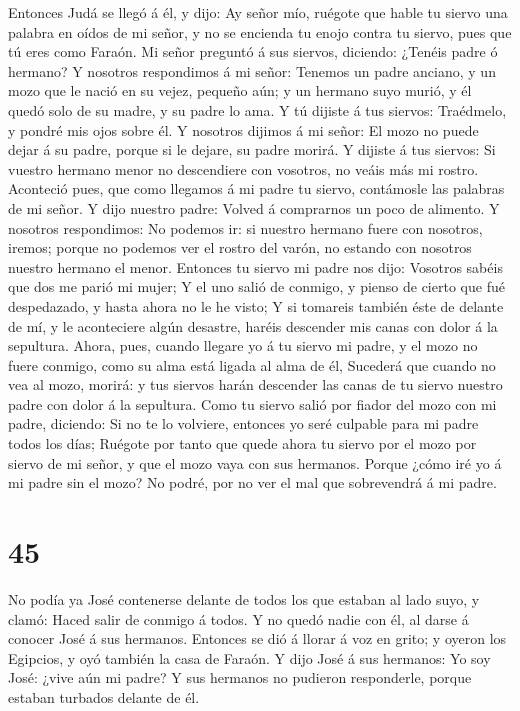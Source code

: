  Entonces Judá se llegó á él, y dijo: Ay señor mío, ruégote
que hable tu siervo una palabra en oídos de mi señor, y no se encienda
tu enojo contra tu siervo, pues que tú eres como Faraón. 
Mi señor preguntó á sus siervos, diciendo: ¿Tenéis padre ó hermano?
 Y nosotros respondimos á mi señor: Tenemos un padre
anciano, y un mozo que le nació en su vejez, pequeño aún; y un hermano
suyo murió, y él quedó solo de su madre, y su padre lo ama.
 Y tú dijiste á tus siervos: Traédmelo, y pondré mis ojos
sobre él.  Y nosotros dijimos á mi señor: El mozo no puede
dejar á su padre, porque si le dejare, su padre morirá.  Y
dijiste á tus siervos: Si vuestro hermano menor no descendiere con
vosotros, no veáis más mi rostro.  Aconteció pues, que como
llegamos á mi padre tu siervo, contámosle las palabras de mi señor.
 Y dijo nuestro padre: Volved á comprarnos un poco de
alimento.  Y nosotros respondimos: No podemos ir: si
nuestro hermano fuere con nosotros, iremos; porque no podemos ver el
rostro del varón, no estando con nosotros nuestro hermano el menor.
 Entonces tu siervo mi padre nos dijo: Vosotros sabéis que
dos me parió mi mujer;  Y el uno salió de conmigo, y pienso
de cierto que fué despedazado, y hasta ahora no le he visto;
 Y si tomareis también éste de delante de mí, y le
aconteciere algún desastre, haréis descender mis canas con dolor á la
sepultura.  Ahora, pues, cuando llegare yo á tu siervo mi
padre, y el mozo no fuere conmigo, como su alma está ligada al alma de
él,  Sucederá que cuando no vea al mozo, morirá: y tus
siervos harán descender las canas de tu siervo nuestro padre con dolor á
la sepultura.  Como tu siervo salió por fiador del mozo con
mi padre, diciendo: Si no te lo volviere, entonces yo seré culpable para
mi padre todos los días;  Ruégote por tanto que quede ahora
tu siervo por el mozo por siervo de mi señor, y que el mozo vaya con sus
hermanos.  Porque ¿cómo iré yo á mi padre sin el mozo? No
podré, por no ver el mal que sobrevendrá á mi padre.

\hypertarget{section-44}{%
\section{45}\label{section-44}}

 No podía ya José contenerse delante de todos los que
estaban al lado suyo, y clamó: Haced salir de conmigo á todos. Y no
quedó nadie con él, al darse á conocer José á sus hermanos. 
Entonces se dió á llorar á voz en grito; y oyeron los Egipcios, y oyó
también la casa de Faraón.  Y dijo José á sus hermanos: Yo
soy José: ¿vive aún mi padre? Y sus hermanos no pudieron responderle,
porque estaban turbados delante de él.

